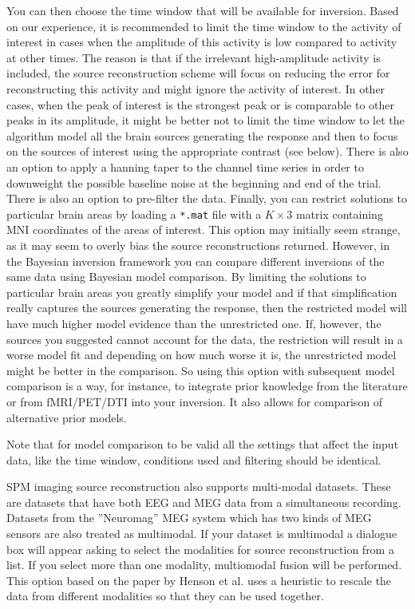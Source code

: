 You can then choose the time window that will be available for inversion. Based on our experience, it is recommended to limit the time window to the activity of interest in cases when the amplitude of this activity is low compared to activity at other times. The reason is that if the irrelevant high-amplitude activity is included, the source reconstruction scheme will focus on reducing the error for reconstructing this activity and might ignore the activity of interest. In other cases, when the peak of interest is the strongest peak or is comparable to other peaks in its amplitude, it might be better not to limit the time window to let the algorithm model all the brain sources generating the response and then to focus on the sources of interest using the appropriate contrast (see below). There is also an option to apply a hanning taper to the channel time series in order to downweight the possible baseline noise at the beginning and end of the trial. There is also an option to pre-filter the data. Finally, you can restrict solutions to particular brain areas by loading a \texttt{*.mat} file with a $K \times 3$ matrix containing MNI coordinates of the areas of interest. This option may initially seem strange, as it may seem to overly bias the source reconstructions returned. However, in the Bayesian inversion framework you can compare different inversions of the same data using Bayesian model comparison. By limiting the solutions to particular brain areas you greatly simplify your model and if that simplification really captures the sources generating the response, then the restricted model will have much higher model evidence than the unrestricted one. If, however, the sources you suggested cannot account for the data, the restriction will result in a worse model fit and depending on how much worse it is, the unrestricted model might be better in the comparison. So using this option with subsequent model comparison is a way, for instance, to integrate prior knowledge from the literature or from fMRI/PET/DTI into your inversion. It also allows for comparison of alternative prior models.

Note that for model comparison to be valid all the settings that affect the input data, like the time window, conditions used and filtering should be identical.

SPM imaging source reconstruction also supports multi-modal datasets. These are datasets that have both EEG and MEG data from a simultaneous recording. Datasets from the ''Neuromag'' MEG system which has two kinds of MEG sensors are also treated as multimodal. If your dataset is multimodal a dialogue box will appear asking to select the modalities for source reconstruction from a list. If you select more than one modality, multiomodal fusion will be performed. This option based on the paper by Henson et al. \cite{rnah_fusion} uses a heuristic to rescale the data from different modalities so that they can be used together. 

